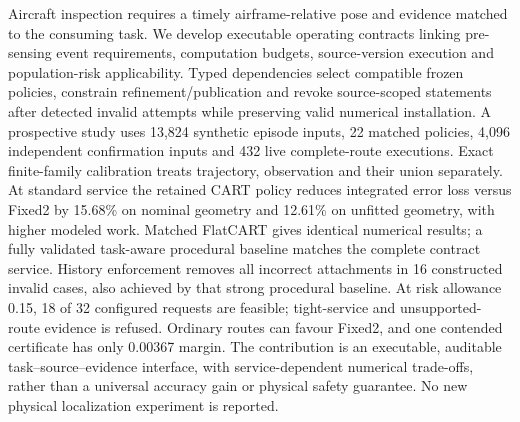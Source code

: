 Aircraft inspection requires a timely airframe-relative pose and evidence matched to the consuming task. We develop executable operating contracts linking pre-sensing event requirements, computation budgets, source-version execution and population-risk applicability. Typed dependencies select compatible frozen policies, constrain refinement/publication and revoke source-scoped statements after detected invalid attempts while preserving valid numerical installation. A prospective study uses 13,824 synthetic episode inputs, 22 matched policies, 4,096 independent confirmation inputs and 432 live complete-route executions. Exact finite-family calibration treats trajectory, observation and their union separately. At standard service the retained CART policy reduces integrated error loss versus Fixed2 by 15.68\% on nominal geometry and 12.61\% on unfitted geometry, with higher modeled work. Matched FlatCART gives identical numerical results; a fully validated task-aware procedural baseline matches the complete contract service. History enforcement removes all incorrect attachments in 16 constructed invalid cases, also achieved by that strong procedural baseline. At risk allowance 0.15, 18 of 32 configured requests are feasible; tight-service and unsupported-route evidence is refused. Ordinary routes can favour Fixed2, and one contended certificate has only 0.00367 margin. The contribution is an executable, auditable task--source--evidence interface, with service-dependent numerical trade-offs, rather than a universal accuracy gain or physical safety guarantee. No new physical localization experiment is reported.
